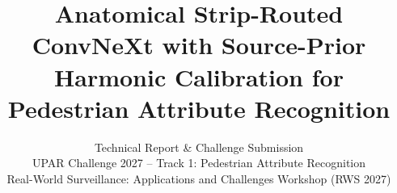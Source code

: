 \documentclass[10pt,twocolumn,letterpaper]{article}
\title{Anatomical Strip-Routed ConvNeXt with Source-Prior Harmonic Calibration for Pedestrian Attribute Recognition}
\author{
  Technical Report \& Challenge Submission\\
  UPAR Challenge 2027 -- Track 1: Pedestrian Attribute Recognition\\
  Real-World Surveillance: Applications and Challenges Workshop (RWS 2027)
}
\begin{document}
\maketitle

    






{
    \small
    
    
}
\end{document}
